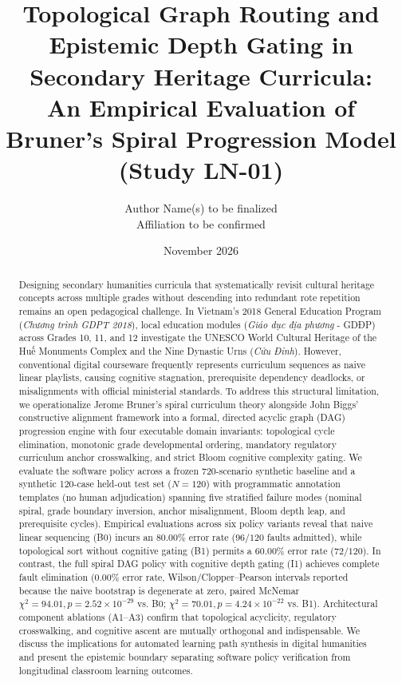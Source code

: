 \documentclass[11pt,a4paper]{article}
\title{\textbf{Topological Graph Routing and Epistemic Depth Gating in Secondary Heritage Curricula:\\An Empirical Evaluation of Bruner's Spiral Progression Model (Study LN-01)}}
\author{
    Author Name(s) to be finalized \\
    \small Affiliation to be confirmed
}
\date{November 2026}
\begin{document}
\maketitle

\begin{abstract}
Designing secondary humanities curricula that systematically revisit cultural heritage concepts across multiple grades without descending into redundant rote repetition remains an open pedagogical challenge. In Vietnam's 2018 General Education Program (\textit{Chương trình GDPT 2018}), local education modules (\textit{Giáo dục địa phương} - GDĐP) across Grades 10, 11, and 12 investigate the UNESCO World Cultural Heritage of the Huế Monuments Complex and the Nine Dynastic Urns (\textit{Cửu Đỉnh}). However, conventional digital courseware frequently represents curriculum sequences as naive linear playlists, causing cognitive stagnation, prerequisite dependency deadlocks, or misalignments with official ministerial standards. To address this structural limitation, we operationalize Jerome Bruner's spiral curriculum theory alongside John Biggs' constructive alignment framework into a formal, directed acyclic graph (DAG) progression engine with four executable domain invariants: topological cycle elimination, monotonic grade developmental ordering, mandatory regulatory curriculum anchor crosswalking, and strict Bloom cognitive complexity gating. We evaluate the software policy across a frozen 720-scenario synthetic baseline and a synthetic 120-case held-out test set ($N=120$) with programmatic annotation templates (no human adjudication) spanning five stratified failure modes (nominal spiral, grade boundary inversion, anchor misalignment, Bloom depth leap, and prerequisite cycles). Empirical evaluations across six policy variants reveal that naive linear sequencing (B0) incurs an 80.00\% error rate ($96/120$ faults admitted), while topological sort without cognitive gating (B1) permits a 60.00\% error rate ($72/120$). In contrast, the full spiral DAG policy with cognitive depth gating (I1) achieves complete fault elimination (0.00\% error rate, Wilson/Clopper--Pearson intervals reported because the naive bootstrap is degenerate at zero, paired McNemar $\chi^2 = 94.01, p = 2.52 \times 10^{-29}$ vs. B0; $\chi^2 = 70.01, p = 4.24 \times 10^{-22}$ vs. B1). Architectural component ablations (A1--A3) confirm that topological acyclicity, regulatory crosswalking, and cognitive ascent are mutually orthogonal and indispensable. We discuss the implications for automated learning path synthesis in digital humanities and present the epistemic boundary separating software policy verification from longitudinal classroom learning outcomes.
\end{abstract}
\end{document}
